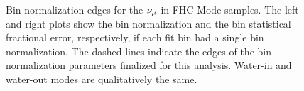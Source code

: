 \begin{figure}


\caption[Bin Normalizations Edges for the $\numu$ in FHC Mode Samples]{Bin normalization edges for the $\protect\nu_{\mu}$ in FHC Mode samples.
The left and right plots show the bin normalization and the bin statistical
fractional error, respectively, if each fit bin had a single bin normalization.
The dashed lines indicate the edges of the bin normalization parameters
finalized for this analysis. Water-in and water-out modes are qualitatively
the same. \label{fig:Bin-normalization-edgesNumuFHC}}
\end{figure}

